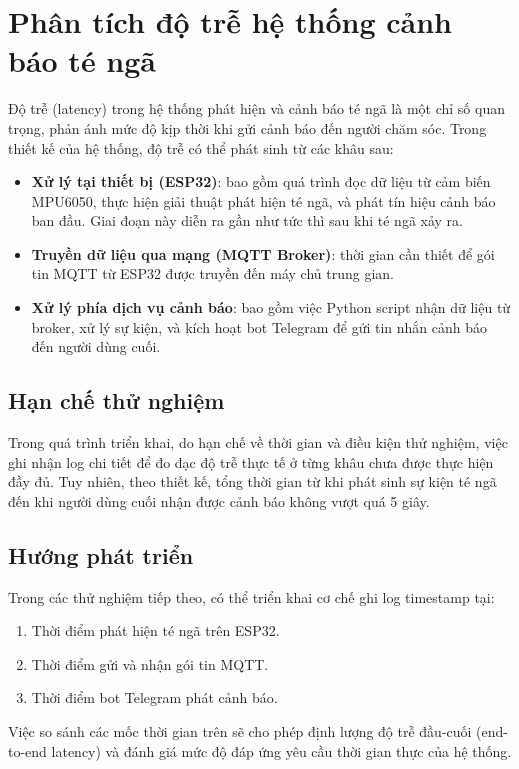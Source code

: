 
\section{Phân tích độ trễ hệ thống cảnh báo té ngã}
\label{sec:latency_analysis}

Độ trễ (latency) trong hệ thống phát hiện và cảnh báo té ngã là một chỉ số quan trọng, phản ánh mức độ kịp thời khi gửi cảnh báo đến người chăm sóc. Trong thiết kế của hệ thống, độ trễ có thể phát sinh từ các khâu sau:

\begin{itemize}
    \item \textbf{Xử lý tại thiết bị (ESP32)}: bao gồm quá trình đọc dữ liệu từ cảm biến MPU6050, thực hiện giải thuật phát hiện té ngã, và phát tín hiệu cảnh báo ban đầu. Giai đoạn này diễn ra gần như tức thì sau khi té ngã xảy ra.
    \item \textbf{Truyền dữ liệu qua mạng (MQTT Broker)}: thời gian cần thiết để gói tin MQTT từ ESP32 được truyền đến máy chủ trung gian.
    \item \textbf{Xử lý phía dịch vụ cảnh báo}: bao gồm việc Python script nhận dữ liệu từ broker, xử lý sự kiện, và kích hoạt bot Telegram để gửi tin nhắn cảnh báo đến người dùng cuối.
\end{itemize}

\subsection*{Hạn chế thử nghiệm}
Trong quá trình triển khai, do hạn chế về thời gian và điều kiện thử nghiệm, việc ghi nhận log chi tiết để đo đạc độ trễ thực tế ở từng khâu chưa được thực hiện đầy đủ. Tuy nhiên, theo thiết kế, tổng thời gian từ khi phát sinh sự kiện té ngã đến khi người dùng cuối nhận được cảnh báo không vượt quá 5 giây.

\subsection*{Hướng phát triển}
Trong các thử nghiệm tiếp theo, có thể triển khai cơ chế ghi log timestamp tại:
\begin{enumerate}
    \item Thời điểm phát hiện té ngã trên ESP32.
    \item Thời điểm gửi và nhận gói tin MQTT.
    \item Thời điểm bot Telegram phát cảnh báo.
\end{enumerate}

Việc so sánh các mốc thời gian trên sẽ cho phép định lượng độ trễ đầu-cuối (end-to-end latency) và đánh giá mức độ đáp ứng yêu cầu thời gian thực của hệ thống.
